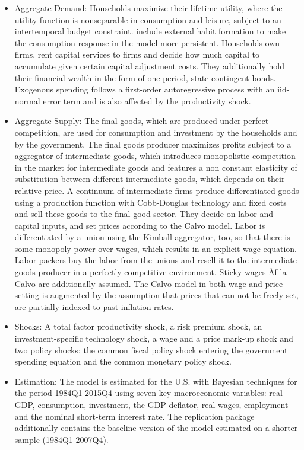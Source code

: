 \documentclass[11pt,a4paper]{article}
\begin{document}
	\begin{itemize}
		
		\item Aggregate Demand: Households maximize their lifetime utility, where the utility function is nonseparable in consumption and leisure, subject to an intertemporal budget constraint. \cite{SmetsWouters2007} include external habit formation to make the consumption response in the model more persistent. Households own firms, rent capital services to firms and decide how much capital to accumulate given certain capital adjustment costs. They additionally hold their financial wealth in the form of one-period, state-contingent bonds. Exogenous spending follows a first-order autoregressive process with an iid-normal error term and is also affected by the productivity shock.
		
		\item Aggregate Supply: The final goods, which are produced under perfect competition, are used for consumption and investment by the households and by the government. The final goods producer maximizes profits subject to a \cite{Kimball1995} aggregator of intermediate goods, which introduces monopolistic competition in the market for intermediate goods and features a non constant elasticity of substitution between different intermediate goods, which depends on their relative price. A continuum of intermediate firms produce differentiated goods using a production function with Cobb-Douglas technology and fixed costs and sell these goods to the final-good sector. They decide on labor and capital inputs, and set prices according to the Calvo model. Labor is differentiated by a union using the Kimball aggregator, too, so that there is some monopoly power over wages, which results in an explicit wage equation. Labor packers buy the labor from the unions and resell it to the intermediate goods producer in a perfectly competitive environment. Sticky wages Ãƒ  la Calvo are additionally assumed. The Calvo model in both wage and price setting is augmented by the assumption that prices that can not be freely set, are partially indexed to past inflation rates.
		
		\item Shocks: A total factor productivity shock, a risk premium shock, an investment-specific technology shock, a wage and a price mark-up shock and two policy shocks: the common fiscal policy shock entering the government spending equation and the common monetary policy shock. 
		
		\item Estimation: The model is estimated for the U.S. with Bayesian techniques for the period 1984Q1-2015Q4 using seven key macroeconomic variables: real GDP, consumption, investment, the GDP deflator, real wages, employment and the nominal short-term interest rate. The replication package additionally contains the baseline version of the model estimated on a shorter sample (1984Q1-2007Q4).
		
	\end{itemize}
	
\end{document}
